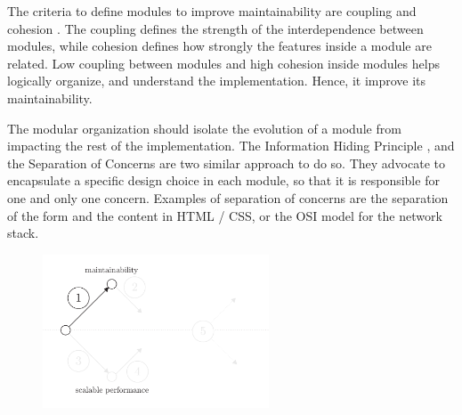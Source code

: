

The criteria to define modules to improve maintainability are coupling and cohesion \cite{Stevens1974}.
The coupling defines the strength of the interdependence between modules, while cohesion defines how strongly the features inside a module are related.
Low coupling between modules and high cohesion inside modules helps logically organize, and understand the implementation.
Hence, it improve its maintainability.



The modular organization should isolate the evolution of a module from impacting the rest of the implementation.
The Information Hiding Principle \cite{Parnas1972}, and the Separation of Concerns \cite{Tarr1999,Hursch1995} are two similar approach to do so.
They advocate to encapsulate a specific design choice in each module, so that it is responsible for one and only one concern.
Examples of separation of concerns are the separation of the form and the content in HTML / CSS, or the OSI model for the network stack.

\begin{figure}[h!] \label{fig:modular-programming-state-of-the-art}
\begin{center}
\includegraphics[width=0.6\textwidth]{../ressources/state-of-the-art-1.pdf}
\end{center}
\end{figure}

